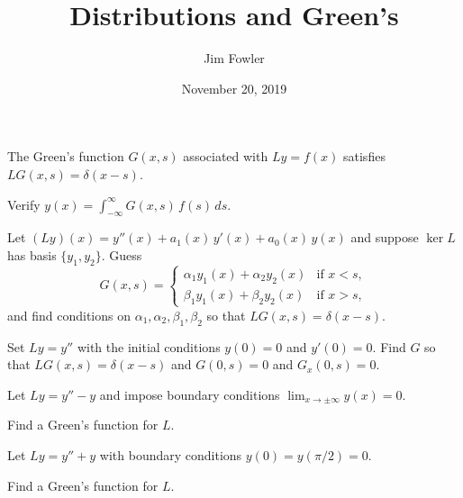 \documentclass{homework}
\author{Jim Fowler}
\title{Distributions and Green's}
\date{November 20, 2019}
\begin{document}
\maketitle

\begin{problem}
The Green's function $G(x,s)$ associated with $Ly = f(x)$ satisfies $LG(x,s) = \delta(x-s)$.

Verify $y(x) = \displaystyle\int_{-\infty}^\infty G(x,s) \, f(s) \, ds$.
\end{problem}

\vfill

\begin{problem}
  Let $(Ly)(x) = y''(x) + a_1(x) \, y'(x) + a_0(x) \, y(x)$ and suppose $\ker L$ has basis $\{ y_1, y_2 \}$.  Guess
  \[
    G(x,s) = \begin{cases}
      \alpha_1 y_1(x) + \alpha_2 y_2(x) & \mbox{if $x < s$}, \\
      \beta_1 y_1(x) + \beta_2 y_2(x) & \mbox{if $x > s$},
    \end{cases}
  \]
  and find conditions on $\alpha_1,\alpha_2,\beta_1,\beta_2$ so that $LG(x,s) = \delta(x-s)$.
\end{problem}

\vfill

\begin{problem}
  Set $Ly = y''$ with the initial conditions $y(0) = 0$ and $y'(0) = 0$.  Find $G$ so that $LG(x,s) = \delta(x-s)$ and $G(0,s) = 0$ and $G_x(0,s) = 0$.  
\end{problem}

\vfill

\begin{problem}
  Let $Ly = y'' - y$ and impose boundary conditions $\lim_{x \to \pm \infty} y(x) = 0$.

  Find a Green's function for $L$.
\end{problem}

\vfill

\begin{problem}
  Let $Ly = y'' + y$ with boundary conditions $y(0) = y(\pi/2) = 0$.

  Find a Green's function for $L$.
\end{problem}

\vfill
\end{document}
